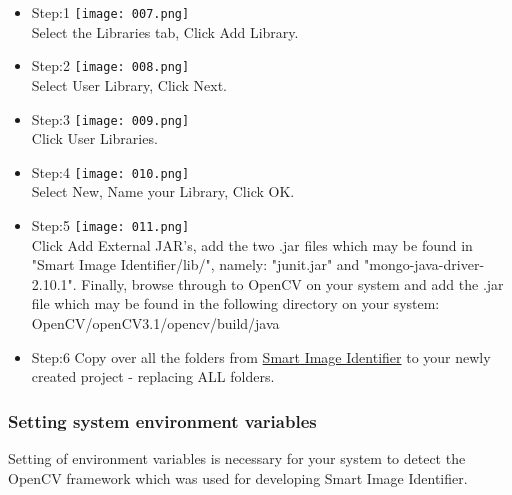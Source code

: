 \documentclass[a4paper,12pt]{report}
\begin{document}
	\begin{itemize}
		\item Step:1	\linebreak
		\texttt{[image: 007.png]}\\
		\linebreak
		Select the Libraries tab, Click Add Library.
		\pagebreak
		\item Step:2	\linebreak
		\texttt{[image: 008.png]}\\ 
		\linebreak 
		Select User Library, Click Next.
		\item Step:3	\linebreak
		\texttt{[image: 009.png]}\\
		\linebreak
		Click User Libraries.
		\pagebreak
		\item Step:4	\linebreak
		\texttt{[image: 010.png]}\\
		\linebreak
		Select New, Name your Library, Click OK.
		\linebreak
		\item Step:5	\linebreak
		\texttt{[image: 011.png]}\\
		\linebreak
		Click Add External JAR's, add the two .jar files which may be found in "Smart Image Identifier/lib/", namely: "junit.jar" and "mongo-java-driver-2.10.1".
		\linebreak\linebreak
		Finally, browse through to OpenCV on your system and add the .jar file which may be found in the following directory on your system: OpenCV/openCV3.1/opencv/build/java		
		\pagebreak
		\item Step:6	\linebreak
		Copy over all the folders from \href{https://github.com/StephenSwanepoel/Ambitious-Designs/tree/master/Smart\%20Image\%20Identifier}{Smart Image Identifier} to your newly created project - replacing ALL folders.
		
		
	\end{itemize}
		
	\subsubsection{Setting system environment variables}
	Setting of environment variables is necessary for your system to detect the OpenCV framework
	which was used for developing Smart Image Identifier.
		
\end{document}
